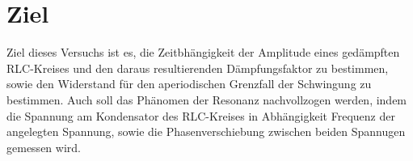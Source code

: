 \section{Ziel}
\label{sec:Ziel}
Ziel dieses Versuchs ist es, die Zeitbhängigkeit der Amplitude eines
gedämpften RLC-Kreises und den daraus resultierenden Dämpfungsfaktor
zu bestimmen, sowie den Widerstand für den aperiodischen Grenzfall der Schwingung
 zu bestimmen. Auch soll das Phänomen der Resonanz nachvollzogen werden, indem
 die Spannung am Kondensator des RLC-Kreises in Abhängigkeit Frequenz der angelegten
 Spannung, sowie die Phasenverschiebung zwischen beiden Spannugen gemessen
 wird.
